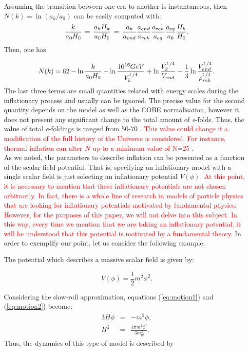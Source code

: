 \documentclass{rmaa}
\def\beq{\begin{equation}}
\def\eeq{\end{equation}}
\def\bea{\begin{eqnarray}}
\def\eea{\end{eqnarray}}
\begin{document}
\noindent
Assuming the transition between one era to another is instantaneous, then $N(k)= \ln ({a_k / a_0})$
can be easily computed with:
$$ 
{k\over a_0 H_0}\,=\,{a_k H_k \over a_0 H_0}\,=\,{a_k\over a_{end}}{a_{end}\over a_{reh}}
{a_{reh}\over a_{eq}}{a_{eq} \over a_0}{H_k\over H_0}.
$$
Then, one has \citep{LiddleLyth}

$$
N(k)=62-\ln{k \over a_0 H_0}-\ln{10^{16} GeV \over V_k^{1/4}}+\ln{V_k^{1/4} \over V_{end}}-
{1 \over 3}\ln{V_{end}^{1/4} \over \rho_{reh}^{1/4}}.
$$
%
The last three terms are small quantities related with energy scales during the inflationary 
process and usually can be ignored.
The precise value for the second quantity depends on the model as well as the 
COBE normalisation, however it does not present any significant change to the total 
amount of \textit{e}-folds. 
Thus, the value of total \textit{e}-foldings is ranged from 50-70 \citep{Lyth}. 
\textcolor{red}{This value could change if a modification of the full history of the Universe is considered. 
For instance, thermal inflation can alter $N$ up to a minimum value of N=25 \citep{Lyth1,Lyth2}.}
\\

As we noted, the parameters to describe inflation can be presented
as a function of the scalar field potential. That is, specifying an inflationary 
model with a single scalar field is just selecting an inflationary potential $V(\phi)$. 
\textcolor{red}{At this point, it is necessary to mention that these inflationary potentials are not chosen arbitrarily. 
In fact, there is a whole line of research in models of particle physics that are looking for inflationary potentials 
motivated by fundamental physics. However, for the purposes of this paper, we will not delve into this subject. 
In this way, every time we mention that we are taking an inflationary potential, it will be 
understood that this potential is motivated by a fundamental theory}. 
In order to exemplify our point, let us consider the following example.


The potential which describes a massive scalar field is given by:

\beq \label{eq:mass}
V(\phi)= \frac{1}{2}m^2 \phi^2.
\eeq

\noindent
Considering the slow-roll approximation, equations (\ref{eq:motion1}) and (\ref{eq:motion2}) become:
%
\bea
3H\dot \phi &=& -m^2 \phi, \\
H^2 &=& \frac{4\pi m^2 \phi^2}{3 m_{pl}^2}.\nonumber
\eea
\noindent
Thus, the dynamics of this type of model is described by
\end{document}
